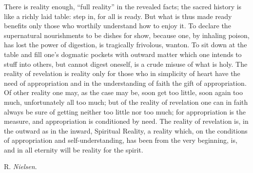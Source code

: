 \documentclass[12pt,a4paper,openany]{book}
\newcommand{\opage}[1]{\marginnote{\footnotesize\textit{[#1]}}}
\newcommand{\signature}[1]{\par\smallskip\hfill #1\hspace*{2em}\par}
\begin{document}
There is reality enough, ``full reality'' in the revealed
facts; the sacred history is like a
richly laid table: step in, for all is ready. But
\setcounter{footnote}{0}%
\opage{38}what is thus made ready benefits only those who worthily
understand how to enjoy it. To declare the supernatural nourishments
to be dishes for show, because one, by inhaling
poison, has lost the power of digestion, is tragically frivolous, wanton.
To sit down at the table and fill one's dogmatic pockets
with outward matter which one intends to stuff into others,
but cannot digest oneself, is a crude misuse of what is
holy. The reality of revelation is reality only
for those who in simplicity of heart have the need of appropriation
and in the understanding of faith the gift of appropriation. Of other
reality one may, as the case may be, soon get
too little, soon again too much, unfortunately all too much;
but of the reality of revelation one can in faith always
be sure of getting neither too little nor too much;
for appropriation is the measure, and appropriation is conditioned by
need. The reality of revelation is, in the outward as
in the inward, Spiritual Reality, a reality which, on the conditions of
appropriation and self-understanding, has been from the very beginning,
is, and in all eternity will be reality
for the spirit.
\signature{R. \emph{Nielsen}.}
\end{document}
